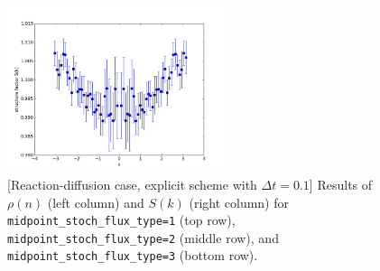\documentclass{article}
\begin{document}
\begin{figure}
\includegraphics[width=0.5\linewidth,height=1.9in]{fig1/appendix_exp_react_dt0.1_Sk_mid3.jpg}
\caption{\label{fig_appendix_exp_react_dt0.1_mid_type}[Reaction-diffusion case, explicit scheme with $\Delta t=0.1$] Results of $\rho(n)$ (left column) and $S(k)$ (right column) for \texttt{midpoint\_stoch\_flux\_type=1} (top row), \texttt{midpoint\_stoch\_flux\_type=2} (middle row), and \texttt{midpoint\_stoch\_flux\_type=3} (bottom row).
}
\end{figure}
\end{document}
